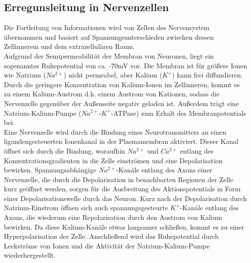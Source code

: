 \documentclass[11pt]{article}
\begin{document}
\subsection{Erregunsleitung in Nervenzellen}
Die Fortleitung von Informationen wird von Zellen des Nervensystem übernommen und basiert auf Spannungsunterschieden zwischen dessen Zellinnerem und dem extrazellulären Raum. \\
Aufgrund der Semipermeabilität der Membran von Neuronen, liegt ein sogenanntes Ruhepotential von ca. -70mV vor. Die Membran ist für größere Ionen wie Natrium ($Na^{2+}$) nicht permeabel, aber Kalium ($K^{+}$) kann frei diffundieren. Durch die geringere Konzentration von Kalium-Ionen im Zellinneren, kommt es zu einem Kalium-Austrom d.h. einem Austrom von Kationen, sodass die Nervenzelle gegenüber der Außenseite negativ geladen ist. Außerdem trägt eine Natrium-Kalium-Pumpe ($Na^{2+}$-$K^+$-ATPase) zum Erhalt des Membranpotentials bei.  \\
Eine Nervenzelle wird durch die Bindung eines Neurotransmitters an einen ligandengesteuerten Ionenkanal in der Plasmamembran aktiviert. Dieser Kanal öffnet sich durch die Bindung, woraufhin $Na^{2+}$ und $Ca^{2+}$ entlang des Konzentrationsgradienten in die Zelle einströmen und eine Depolarisation bewirken. Spannungsabhängige $Na^{2+}$-Kanäle entlang des Axons einer Nervenzelle, die durch die Depolarisation in benachbarten Regionen der Zelle kurz geöffnet werden, sorgen für die Ausbreitung des Aktionspotentials in Form einer Depolarisationswelle durch das Neuron. Kurz nach der Depolarisation durch Natrium-Einstrom öffnen sich auch spannungsgesteurte $K^+$-Kanäle entlang des Axons, die wiederum eine Repolarisation durch den Austrom von Kalium bewirken. Da diese Kalium-Kanäle etwas langsamer schließen, kommt es zu einer Hyperpolarisation der Zelle. Anschließend wird das Ruhepotential durch Leckströme von Ionen und die Aktivität der Natrium-Kalium-Pumpe wiederhergestellt.  \cite{lehninger}
\end{document}
